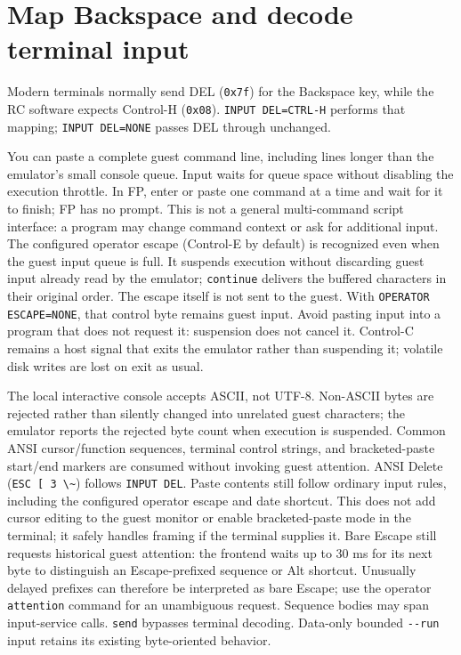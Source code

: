 \section{Map Backspace and decode terminal input}\label{map-backspace-and-decode-terminal-input}

Modern terminals normally send DEL (\passthrough{\lstinline!0x7f!}) for the Backspace key, while the RC software expects Control-H (\passthrough{\lstinline!0x08!}). \passthrough{\lstinline!INPUT DEL=CTRL-H!} performs that mapping; \passthrough{\lstinline!INPUT DEL=NONE!} passes DEL through unchanged.

You can paste a complete guest command line, including lines longer than the emulator's small console queue. Input waits for queue space without disabling the execution throttle. In FP, enter or paste one command at a time and wait for it to finish; FP has no prompt. This is not a general multi-command script interface: a program may change command context or ask for additional input. The configured operator escape (Control-E by default) is recognized even when the guest input queue is full. It suspends execution without discarding guest input already read by the emulator; \passthrough{\lstinline!continue!} delivers the buffered characters in their original order. The escape itself is not sent to the guest. With \passthrough{\lstinline!OPERATOR ESCAPE=NONE!}, that control byte remains guest input. Avoid pasting input into a program that does not request it: suspension does not cancel it. Control-C remains a host signal that exits the emulator rather than suspending it; volatile disk writes are lost on exit as usual.

The local interactive console accepts ASCII, not UTF-8. Non-ASCII bytes are rejected rather than silently changed into unrelated guest characters; the emulator reports the rejected byte count when execution is suspended. Common ANSI cursor/function sequences, terminal control strings, and bracketed-paste start/end markers are consumed without invoking guest attention. ANSI Delete (\passthrough{\lstinline!ESC [ 3 \~!}) follows \passthrough{\lstinline!INPUT DEL!}. Paste contents still follow ordinary input rules, including the configured operator escape and date shortcut. This does not add cursor editing to the guest monitor or enable bracketed-paste mode in the terminal; it safely handles framing if the terminal supplies it. Bare Escape still requests historical guest attention: the frontend waits up to 30 ms for its next byte to distinguish an Escape-prefixed sequence or Alt shortcut. Unusually delayed prefixes can therefore be interpreted as bare Escape; use the operator \passthrough{\lstinline!attention!} command for an unambiguous request. Sequence bodies may span input-service calls. \passthrough{\lstinline!send!} bypasses terminal decoding. Data-only bounded \passthrough{\lstinline!--run!} input retains its existing byte-oriented behavior.

